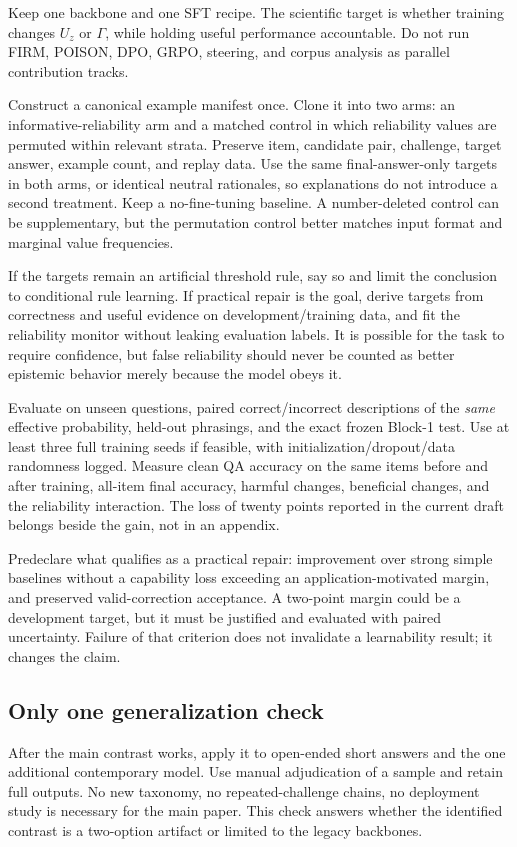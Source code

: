 \documentclass[11pt]{article}
\begin{document}
Keep one backbone and one SFT recipe. The scientific target is whether training changes $U_z$ or $\Gamma$, while holding useful performance accountable. Do not run FIRM, POISON, DPO, GRPO, steering, and corpus analysis as parallel contribution tracks.

Construct a canonical example manifest once. Clone it into two arms: an informative-reliability arm and a matched control in which reliability values are permuted within relevant strata. Preserve item, candidate pair, challenge, target answer, example count, and replay data. Use the same final-answer-only targets in both arms, or identical neutral rationales, so explanations do not introduce a second treatment. Keep a no-fine-tuning baseline. A number-deleted control can be supplementary, but the permutation control better matches input format and marginal value frequencies.

If the targets remain an artificial threshold rule, say so and limit the conclusion to conditional rule learning. If practical repair is the goal, derive targets from correctness and useful evidence on development/training data, and fit the reliability monitor without leaking evaluation labels. It is possible for the task to require confidence, but false reliability should never be counted as better epistemic behavior merely because the model obeys it.

Evaluate on unseen questions, paired correct/incorrect descriptions of the \emph{same} effective probability, held-out phrasings, and the exact frozen Block-1 test. Use at least three full training seeds if feasible, with initialization/dropout/data randomness logged. Measure clean QA accuracy on the same items before and after training, all-item final accuracy, harmful changes, beneficial changes, and the reliability interaction. The loss of twenty points reported in the current draft belongs beside the gain, not in an appendix.

Predeclare what qualifies as a practical repair: improvement over strong simple baselines without a capability loss exceeding an application-motivated margin, and preserved valid-correction acceptance. A two-point margin could be a development target, but it must be justified and evaluated with paired uncertainty. Failure of that criterion does not invalidate a learnability result; it changes the claim.

\subsection{Only one generalization check}
After the main contrast works, apply it to open-ended short answers and the one additional contemporary model. Use manual adjudication of a sample and retain full outputs. No new taxonomy, no repeated-challenge chains, no deployment study is necessary for the main paper. This check answers whether the identified contrast is a two-option artifact or limited to the legacy backbones.
\end{document}
